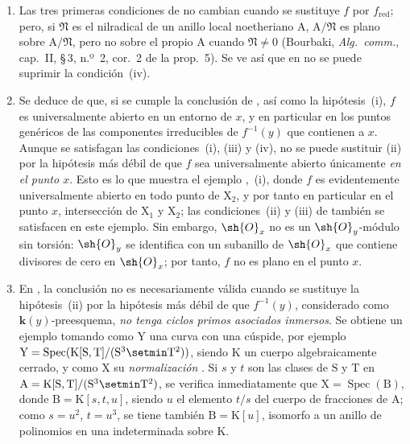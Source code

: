 \begin{remarks}[15.2.4]
\label{IV.15.2.4}
\begin{enumerate}[label=(\roman*)]
  \item Las tres primeras condiciones de  no cambian cuando se sustituye $f$ por $f_\mathrm{red}$; pero, si $\mathfrak{N}$ es el nilradical de un anillo local noetheriano $\mathrm{A}$, $\mathrm{A}/\mathfrak{N}$ es plano sobre $\mathrm{A}/\mathfrak{N}$, pero no sobre el propio $\mathrm{A}$ cuando $\mathfrak{N}\neq 0$ (Bourbaki, \emph{Alg.\ comm.}, cap.~II, \S\,3, n.º~2, cor.~2 de la prop.~5).
Se ve así que en  no se puede suprimir la condición~(iv).
  \item Se deduce de  que, si se cumple la conclusión de , así como la hipótesis~(i), $f$ es universalmente abierto en un entorno de $x$, y en particular en los puntos genéricos de las componentes irreducibles de $f^{-1}(y)$ que contienen a $x$.
Aunque se satisfagan las condiciones~(i), (iii) y (iv), no se puede sustituir (ii) por la hipótesis más débil de que $f$ sea universalmente abierto únicamente \emph{en el punto $x$}.
Esto es lo que muestra el ejemplo ,~(i), donde $f$ es evidentemente universalmente abierto en todo punto de $\mathrm{X}_2$, y por tanto en particular en el punto $x$, intersección de $\mathrm{X}_1$ y $\mathrm{X}_2$; las condiciones~(ii) y (iii) de  también se satisfacen en este ejemplo.
Sin embargo, $\sh{O}_x$ no es un $\sh{O}_y$-módulo sin torsión: $\sh{O}_y$ se identifica con un subanillo de $\sh{O}_x$ que contiene divisores de cero en $\sh{O}_x$; por tanto, $f$ no es plano en el punto $x$.
  \item En , la conclusión no es necesariamente válida cuando se sustituye la hipótesis~(ii) por la hipótesis más débil de que $f^{-1}(y)$, considerado como $\boldsymbol{k}(y)$-preesquema, \emph{no tenga ciclos primos asociados inmersos}.
Se obtiene un ejemplo tomando como $\mathrm{Y}$ una curva con una cúspide, por ejemplo $\mathrm{Y}=\operatorname{Spec}(\mathrm{K}[\mathrm{S},\mathrm{T}]/(\mathrm{S}^3\setmin\mathrm{T}^2))$, siendo $\mathrm{K}$ un cuerpo algebraicamente cerrado, y como $\mathrm{X}$ su \emph{normalización} .
Si $s$ y $t$ son las clases de $\mathrm{S}$ y $\mathrm{T}$ en $\mathrm{A}=\mathrm{K}[\mathrm{S},\mathrm{T}]/(\mathrm{S}^3\setmin\mathrm{T}^2)$, se verifica inmediatamente que $\mathrm{X}=\operatorname{Spec}(\mathrm{B})$, donde $\mathrm{B}=\mathrm{K}[s,t,u]$, siendo $u$ el elemento $t/s$ del cuerpo de fracciones de $\mathrm{A}$; como $s=u^2$, $t=u^3$, se tiene también $\mathrm{B}=\mathrm{K}[u]$, isomorfo a un anillo de polinomios en una indeterminada sobre $\mathrm{K}$.

\end{enumerate}
\end{remarks}
